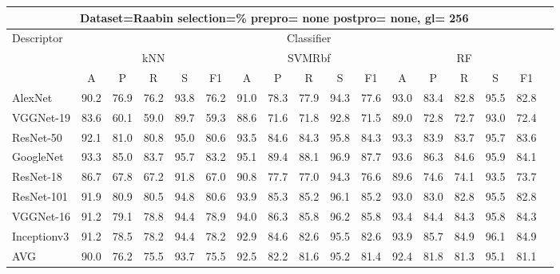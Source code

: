 \documentclass[12pt,italian]{article}
\begin{document}
\begin{tiny}
\begin{longtable}{lcccccccccccccccc}
\toprule
\multicolumn{16}{c}{Dataset=Raabin selection=\% prepro= none postpro= none, gl= 256} \\ 
\toprule
Descriptor & \multicolumn{15}{c}{Classifier} \\ 
& \multicolumn{5}{c}{kNN} & \multicolumn{5}{c}{SVMRbf} & \multicolumn{5}{c}{RF} \\ 
& A & P & R & S & F1 & A & P & R & S & F1 & A & P & R & S & F1 \\ 
\midrule
AlexNet & 90.2 & 76.9 & 76.2 & 93.8 & 76.2 & 91.0 & 78.3 & 77.9 & 94.3 & 77.6 & 93.0 & 83.4 & 82.8 & 95.5 & 82.8 \\ 
VGGNet-19 & 83.6 & 60.1 & 59.0 & 89.7 & 59.3 & 88.6 & 71.6 & 71.8 & 92.8 & 71.5 & 89.0 & 72.8 & 72.7 & 93.0 & 72.4 \\ 
ResNet-50 & 92.1 & 81.0 & 80.8 & 95.0 & 80.6 & 93.5 & 84.6 & 84.3 & 95.8 & 84.3 & 93.3 & 83.9 & 83.7 & 95.7 & 83.6 \\ 
GoogleNet & 93.3 & 85.0 & 83.7 & 95.7 & 83.2 & 95.1 & 89.4 & 88.1 & 96.9 & 87.7 & 93.6 & 86.3 & 84.6 & 95.9 & 84.1 \\ 
ResNet-18 & 86.7 & 67.8 & 67.2 & 91.8 & 67.0 & 90.8 & 77.7 & 77.0 & 94.3 & 76.6 & 89.6 & 74.6 & 74.1 & 93.5 & 73.7 \\ 
ResNet-101 & 91.9 & 80.9 & 80.5 & 94.8 & 80.6 & 93.9 & 85.3 & 85.2 & 96.1 & 85.2 & 93.0 & 83.0 & 82.8 & 95.5 & 82.8 \\ 
VGGNet-16 & 91.2 & 79.1 & 78.8 & 94.4 & 78.9 & 94.0 & 86.3 & 85.8 & 96.2 & 85.8 & 93.4 & 84.4 & 84.3 & 95.8 & 84.3 \\ 
Inceptionv3 & 91.2 & 78.5 & 78.2 & 94.4 & 78.2 & 92.9 & 84.6 & 82.6 & 95.5 & 82.6 & 93.9 & 85.7 & 84.9 & 96.1 & 84.9 \\ 
\hline
AVG & 90.0 & 76.2 & 75.5 & 93.7 & 75.5 & 92.5 & 82.2 & 81.6 & 95.2 & 81.4 & 92.4 & 81.8 & 81.3 & 95.1 & 81.1 \\ 
\hline
\bottomrule
\end{longtable} 

 \pagebreak 
\end{tiny} 
 
\end{document}
